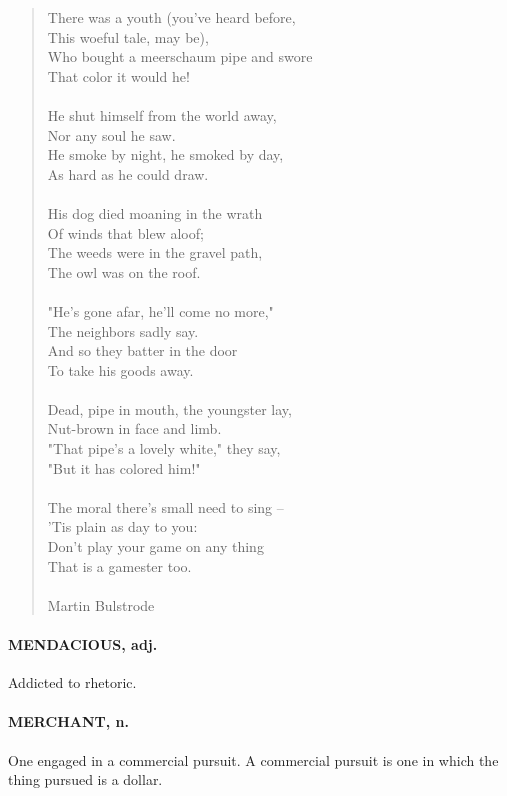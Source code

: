 \documentclass[11pt]{article}
\begin{document}
\begin{quote}   There was a youth (you've heard before, \\
      This woeful tale, may be), \\
  Who bought a meerschaum pipe and swore \\
      That color it would he! \\
 \\
  He shut himself from the world away, \\
      Nor any soul he saw. \\
  He smoke by night, he smoked by day, \\
      As hard as he could draw. \\
 \\
  His dog died moaning in the wrath \\
      Of winds that blew aloof; \\
  The weeds were in the gravel path, \\
      The owl was on the roof. \\
 \\
  "He's gone afar, he'll come no more," \\
      The neighbors sadly say. \\
  And so they batter in the door \\
      To take his goods away. \\
 \\
  Dead, pipe in mouth, the youngster lay, \\
      Nut-brown in face and limb. \\
  "That pipe's a lovely white," they say, \\
      "But it has colored him!" \\
 \\
  The moral there's small need to sing -- \\
      'Tis plain as day to you: \\
  Don't play your game on any thing \\
      That is a gamester too. \\
 \\
Martin Bulstrode \end{quote}


\paragraph{MENDACIOUS, adj.}  Addicted to rhetoric.

\paragraph{MERCHANT, n.}  One engaged in a commercial pursuit.  A commercial
pursuit is one in which the thing pursued is a dollar.
\end{document}
